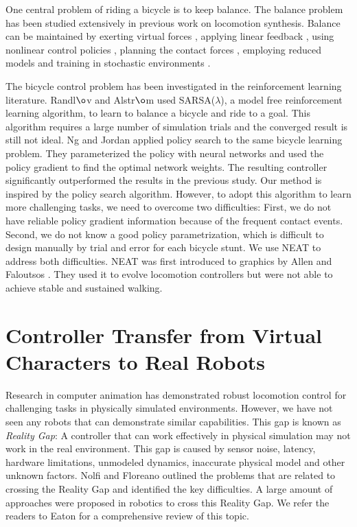 One central problem of riding a bicycle is to keep balance. The balance problem has been studied extensively in previous work on locomotion synthesis. Balance can be maintained by exerting virtual forces \cite{Pratt2001,Coros2010}, applying linear feedback \cite{Laszlo:1996,Yin:2007,daSilva:2008,Coros2010}, using nonlinear control policies \cite{Muico:2009}, planning the contact forces \cite{Muico:2009,Tan:2012}, employing reduced models \cite{Tsai:2010,Kwon:2010,Mordatch:2010:RPL,Coros2010,Ye:2010} and training in stochastic environments \cite{Wang:2010}.

The bicycle control problem has been investigated in the reinforcement learning literature. Randl$\o$v and Alstr$\o$m \cite{RandlovAlstrom:1998} used SARSA($\lambda$), a model free reinforcement learning algorithm, to learn to balance a bicycle and ride to a goal. This algorithm requires a large number of simulation trials and the converged result is still not ideal. Ng and Jordan \cite{Ng:2000:PPS} applied policy search to the same bicycle learning problem. They parameterized the policy with neural networks and used the policy gradient to find the optimal network weights. The resulting controller significantly outperformed the results in the previous study. Our method is inspired by the policy search algorithm. However, to adopt this algorithm to learn more challenging tasks, we need to overcome two difficulties: First, we do not have reliable policy gradient information because of the frequent contact events. Second, we do not know a good policy parametrization, which is difficult to design manually by trial and error for each bicycle stunt. We use NEAT \cite{Stanley:2002:ENN} to address both difficulties. NEAT was first introduced to graphics by Allen and Faloutsos \cite{Allen2009}. They used it to evolve locomotion controllers but were not able to achieve stable and sustained walking.

\section{Controller Transfer from Virtual Characters to Real Robots}
Research in computer animation has demonstrated robust locomotion control for challenging tasks in physically simulated environments. However, we have not seen any robots that can demonstrate similar capabilities. This gap is known as \emph{Reality Gap}: A controller that can work effectively in physical simulation may not work in the real environment. This gap is caused by sensor noise, latency, hardware limitations, unmodeled dynamics, inaccurate physical model and other unknown factors. Nolfi and Floreano \cite{Nolfi:2000} outlined the problems that are related to crossing the Reality Gap and identified the key difficulties. A large amount of approaches were proposed in robotics to cross this Reality Gap. We refer the readers to Eaton \cite{Eaton:2015} for a comprehensive review of this topic.

